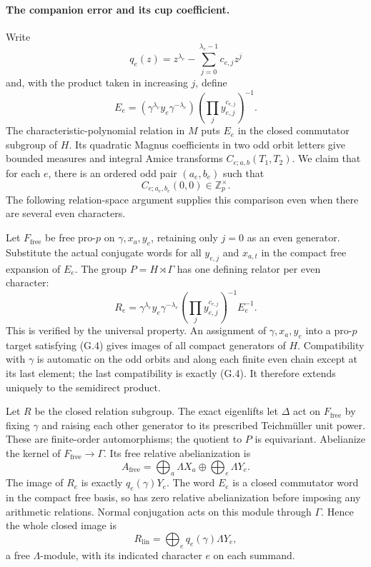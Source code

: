 \paragraph{The companion error and its cup coefficient.}
Write
\[
 q_e(z)=z^{\lambda_e}-\sum_{j=0}^{\lambda_e-1}c_{e,j}z^j
\]
and, with the product taken in increasing $j$, define
\[
 E_e=(\gamma^{\lambda_e}y_e\gamma^{-\lambda_e})
          \left(\prod_jy_{e,j}^{c_{e,j}}\right)^{-1}.
\]
The characteristic-polynomial relation in $M$ puts $E_e$ in the closed commutator subgroup of $H$. Its quadratic Magnus coefficients in two odd orbit letters give bounded measures and integral Amice transforms $C_{e;a,b}(T_1,T_2)$. We claim that for each $e$, there is an ordered odd pair $(a_e,b_e)$ such that
\[
 C_{e;a_e,b_e}(0,0)\in\mathbb Z_p^\times.                       \tag{G.3}
\]
The following relation-space argument supplies this comparison even when there are several even characters.

Let $F_{\mathrm{free}}$ be free pro-$p$ on $\gamma,x_a,y_e$, retaining only $j=0$ as an even generator. Substitute the actual conjugate words for all $y_{e,j}$ and $x_{a,t}$ in the compact free expansion of $E_e$. The group $P=H\rtimes\Gamma$ has one defining relator per even character:
\[
 R_e=\gamma^{\lambda_e}y_e\gamma^{-\lambda_e}
       \left(\prod_jy_{e,j}^{c_{e,j}}\right)^{-1}E_e^{-1}.       \tag{G.4}
\]
This is verified by the universal property. An assignment of $\gamma,x_a,y_e$ into a pro-$p$ target satisfying (G.4) gives images of all compact generators of $H$. Compatibility with $\gamma$ is automatic on the odd orbits and along each finite even chain except at its last element; the last compatibility is exactly (G.4). It therefore extends uniquely to the semidirect product.

Let $R$ be the closed relation subgroup. The exact eigenlifts let $\Delta$ act on $F_{\mathrm{free}}$ by fixing $\gamma$ and raising each other generator to its prescribed Teichm\"uller unit power. These are finite-order automorphisms; the quotient to $P$ is equivariant. Abelianize the kernel of $F_{\mathrm{free}}\to\Gamma$. Its free relative abelianization is
\[
 A_{\mathrm{free}}=
   \bigoplus_a\Lambda X_a\oplus\bigoplus_e\Lambda Y_e.
\]
The image of $R_e$ is exactly $q_e(\gamma)Y_e$. The word $E_e$ is a closed commutator word in the compact free basis, so has zero relative abelianization before imposing any arithmetic relations. Normal conjugation acts on this module through $\Gamma$. Hence the whole closed image is
\[
 R_{\mathrm{lin}}=\bigoplus_eq_e(\gamma)\Lambda Y_e,             \tag{G.5}
\]
a free $\Lambda$-module, with its indicated character $e$ on each summand.

